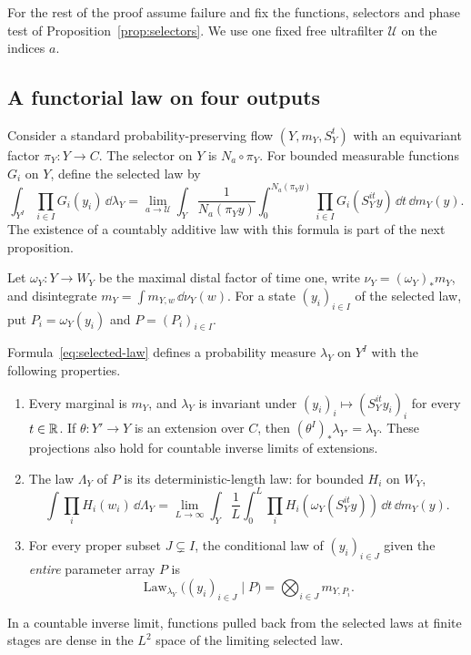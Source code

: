 For the rest of the proof assume failure and fix the functions,
selectors and phase test of Proposition~\ref{prop:selectors}.
We use one fixed free ultrafilter $\mathcal U$ on the indices $a$.

\subsection{A functorial law on four outputs}

Consider a standard probability-preserving flow
$(Y,m_Y,S_Y^t)$ with an equivariant factor $\pi_Y:Y\to C$.
The selector on $Y$ is $N_a\circ\pi_Y$.  For bounded measurable
functions $G_i$ on $Y$, define the selected law by
\begin{equation}\label{eq:selected-law}
 \int_{Y^I}\prod_{i\in I}G_i(y_i)\,\dd\lambda_Y
 =\lim_{a\to\mathcal U}
 \int_Y\frac1{N_a(\pi_Yy)}
 \int_0^{N_a(\pi_Yy)}\prod_{i\in I}G_i(S_Y^{it}y)
 \,\dd t\,\dd m_Y(y).
\end{equation}
The existence of a countably additive law with this formula is part
of the next proposition.

Let $\omega_Y:Y\to W_Y$ be the maximal distal factor of time one,
write $\nu_Y=(\omega_Y)_*m_Y$, and disintegrate
$m_Y=\int m_{Y,w}\,\dd\nu_Y(w)$.  For a state
$(y_i)_{i\in I}$ of the selected law, put
$P_i=\omega_Y(y_i)$ and $P=(P_i)_{i\in I}$.

\begin{proposition}\label{prop:selected}
Formula~\eqref{eq:selected-law} defines a probability measure
$\lambda_Y$ on $Y^I$ with the following properties.
\begin{enumerate}
\item Every marginal is $m_Y$, and $\lambda_Y$ is invariant under
$(y_i)_i\mapsto(S_Y^{it}y_i)_i$ for every $t\in\mathbb R$.
If $\theta:Y'\to Y$ is an extension over $C$, then
$(\theta^I)_*\lambda_{Y'}=\lambda_Y$.  These projections also hold
for countable inverse limits of extensions.
\item The law $\Lambda_Y$ of $P$ is its deterministic-length law:
for bounded $H_i$ on $W_Y$,
\begin{equation}\label{eq:ordinary-parameter-law}
 \int\prod_iH_i(w_i)\,\dd\Lambda_Y
 =\lim_{L\to\infty}\int_Y\frac1L\int_0^L
       \prod_i H_i(\omega_Y(S_Y^{it}y))\,\dd t\,\dd m_Y(y).
\end{equation}
\item For every proper subset $J\subsetneq I$, the conditional law
of $(y_i)_{i\in J}$ given the \emph{entire} parameter array $P$ is
\begin{equation}\label{eq:proper-fibres}
 \operatorname{Law}_{\lambda_Y}\bigl((y_i)_{i\in J}\mid P\bigr)
 =\bigotimes_{i\in J}m_{Y,P_i}.
\end{equation}
\end{enumerate}
In a countable inverse limit, functions pulled back from the selected
laws at finite stages are dense in the $L^2$ space of the limiting
selected law.
\end{proposition}

